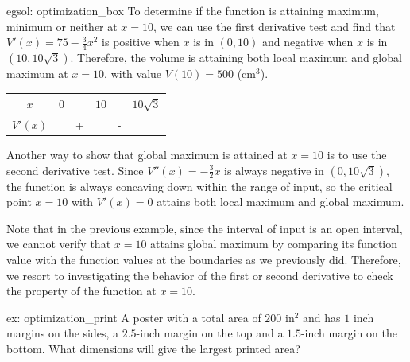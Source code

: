 \begin{egsol}[]{egsol: optimization_box}
    To determine if the function is attaining maximum, minimum or neither at $x = 10$, we can use the first derivative test and find that $V'(x) = 75 - \frac{3}{4}x^2$ is positive when $x$ is in $(0, 10)$ and negative when $x$ is in $(10, 10\sqrt{3})$.  Therefore, the volume is attaining both local maximum and global maximum at $x = 10$, with value $V(10) = 500$ (cm$^3$).
    \begin{center}
        \begin{tabular}{cccccc}
            $x$    & $0$ &   & $10$ &   & $10\sqrt{3}$  \\
            \hline
            $V'(x)$ &     & + &      & - & 
        \end{tabular}
    \end{center}
    Another way to show that global maximum is attained at $x = 10$ is to use the second derivative test.  Since $V''(x) = -\frac{3}{2}x$ is always negative in $(0, 10\sqrt{3})$, the function is always concaving down within the range of input, so the critical point $x = 10$ with $V'(x) = 0$ attains both local maximum and global maximum.
\end{egsol}

Note that in the previous example, since the interval of input is an open interval, we cannot verify that $x = 10$ attains global maximum by comparing its function value with the function values at the boundaries as we previously did.  Therefore, we resort to investigating the behavior of the first or second derivative to check the property of the function at $x = 10$.

\begin{ex}[]{ex: optimization_print}
    A poster with a total area of $200$ in$^2$ and has $1$ inch margins on the sides, a $2.5$-inch margin on the top and a $1.5$-inch margin on the bottom. What dimensions will give the largest printed area?
\end{ex}

